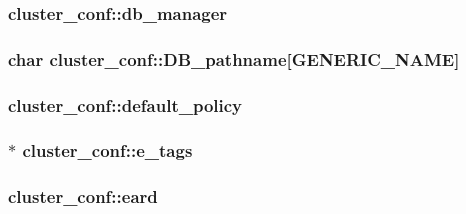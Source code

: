 \subsubsection[{\texorpdfstring{db\+\_\+manager}{db_manager}}]{ cluster\+\_\+conf\+::db\+\_\+manager}\hypertarget{structcluster__conf_a016de976528366e07768557d689f731d}{}\label{structcluster__conf_a016de976528366e07768557d689f731d}
\subsubsection[{\texorpdfstring{D\+B\+\_\+pathname}{DB_pathname}}]{\setlength{\rightskip}{0pt plus 5cm}char cluster\+\_\+conf\+::\+D\+B\+\_\+pathname\mbox{[}{\bf G\+E\+N\+E\+R\+I\+C\+\_\+\+N\+A\+ME}\mbox{]}}\hypertarget{structcluster__conf_a8ea0321232d44d691e73ce38d5bc0fb8}{}\label{structcluster__conf_a8ea0321232d44d691e73ce38d5bc0fb8}
\subsubsection[{\texorpdfstring{default\+\_\+policy}{default_policy}}]{ cluster\+\_\+conf\+::default\+\_\+policy}\hypertarget{structcluster__conf_a859efe453a12849a42e81b6816cd1ec4}{}\label{structcluster__conf_a859efe453a12849a42e81b6816cd1ec4}
\subsubsection[{\texorpdfstring{e\+\_\+tags}{e_tags}}]{$\ast$ cluster\+\_\+conf\+::e\+\_\+tags}\hypertarget{structcluster__conf_aa0e8e716d432ec01d8991f0e5c06bbc8}{}\label{structcluster__conf_aa0e8e716d432ec01d8991f0e5c06bbc8}
\subsubsection[{\texorpdfstring{eard}{eard}}]{ cluster\+\_\+conf\+::eard}\hypertarget{structcluster__conf_affd58ce65e7c6a7af4a0092b51b787df}{}\label{structcluster__conf_affd58ce65e7c6a7af4a0092b51b787df}
